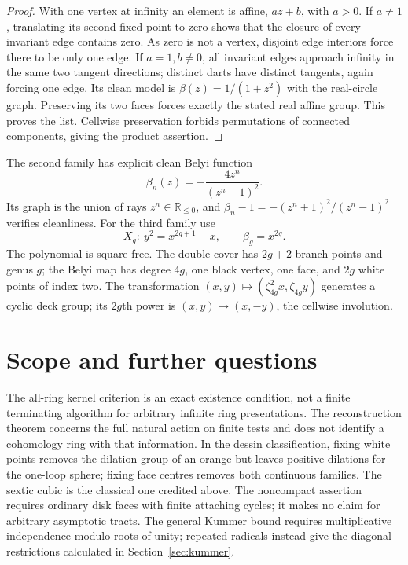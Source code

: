 \documentclass[11pt,a4paper]{article}
\theoremstyle{definition}
\newcommand{\R}{\mathbb R}
\begin{document}
\begin{proof}
With one vertex at infinity an element is affine, $az+b$, with $a>0$. If $a\ne1$, translating its second fixed point to zero shows that the closure of every invariant edge contains zero. As zero is not a vertex, disjoint edge interiors force there to be only one edge. If $a=1,b\ne0$, all invariant edges approach infinity in the same two tangent directions; distinct darts have distinct tangents, again forcing one edge. Its clean model is $\beta(z)=1/(1+z^2)$ with the real-circle graph. Preserving its two faces forces exactly the stated real affine group. This proves the list. Cellwise preservation forbids permutations of connected components, giving the product assertion.
\end{proof}

The second family has explicit clean Belyi function
\[
 \beta_n(z)=-\frac{4z^n}{(z^n-1)^2}.
\]
Its graph is the union of rays $z^n\in\R_{\le0}$, and $\beta_n-1=-(z^n+1)^2/(z^n-1)^2$ verifies cleanliness. For the third family use
\[
 X_g:\ y^2=x^{2g+1}-x,\qquad\beta_g=x^{2g}.
\]
The polynomial is square-free. The double cover has $2g+2$ branch points and genus $g$; the Belyi map has degree $4g$, one black vertex, one face, and $2g$ white points of index two. The transformation $(x,y)\mapsto(\zeta_{4g}^2x,\zeta_{4g}y)$ generates a cyclic deck group; its $2g$th power is $(x,y)\mapsto(x,-y)$, the cellwise involution.





\section{Scope and further questions}\label{sec:scope}
The all-ring kernel criterion is an exact existence condition, not a finite terminating algorithm for arbitrary infinite ring presentations. The reconstruction theorem concerns the full natural action on finite tests and does not identify a cohomology ring with that information. In the dessin classification, fixing white points removes the dilation group of an orange but leaves positive dilations for the one-loop sphere; fixing face centres removes both continuous families. The sextic cubic is the classical one credited above. The noncompact assertion requires ordinary disk faces with finite attaching cycles; it makes no claim for arbitrary asymptotic tracts. The general Kummer bound requires multiplicative independence modulo roots of unity; repeated radicals instead give the diagonal restrictions calculated in Section~\ref{sec:kummer}.
\end{document}
